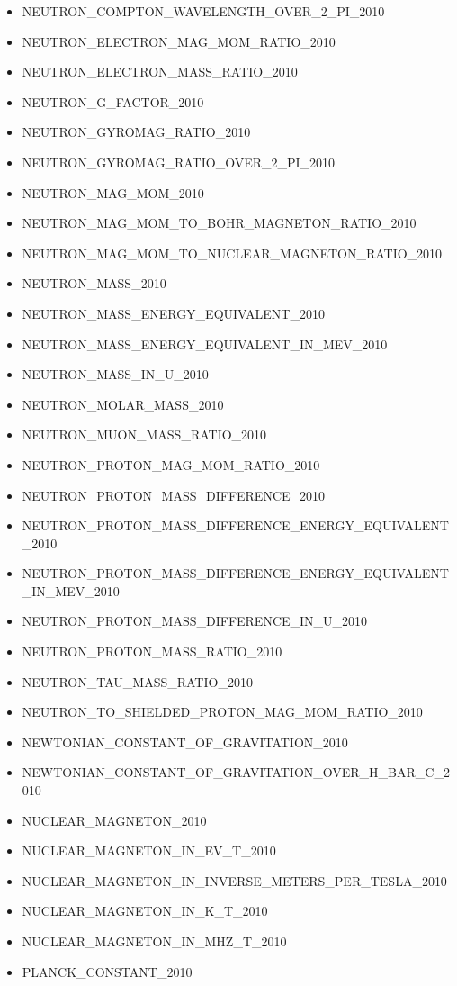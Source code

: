 \begin{itemize}
\item NEUTRON\_COMPTON\_WAVELENGTH\_OVER\_2\_PI\_2010
\item NEUTRON\_ELECTRON\_MAG\_MOM\_RATIO\_2010
\item NEUTRON\_ELECTRON\_MASS\_RATIO\_2010
\item NEUTRON\_G\_FACTOR\_2010
\item NEUTRON\_GYROMAG\_RATIO\_2010
\item NEUTRON\_GYROMAG\_RATIO\_OVER\_2\_PI\_2010
\item NEUTRON\_MAG\_MOM\_2010
\item NEUTRON\_MAG\_MOM\_TO\_BOHR\_MAGNETON\_RATIO\_2010
\item NEUTRON\_MAG\_MOM\_TO\_NUCLEAR\_MAGNETON\_RATIO\_2010
\item NEUTRON\_MASS\_2010
\item NEUTRON\_MASS\_ENERGY\_EQUIVALENT\_2010
\item NEUTRON\_MASS\_ENERGY\_EQUIVALENT\_IN\_MEV\_2010
\item NEUTRON\_MASS\_IN\_U\_2010
\item NEUTRON\_MOLAR\_MASS\_2010
\item NEUTRON\_MUON\_MASS\_RATIO\_2010
\item NEUTRON\_PROTON\_MAG\_MOM\_RATIO\_2010
\item NEUTRON\_PROTON\_MASS\_DIFFERENCE\_2010
\item NEUTRON\_PROTON\_MASS\_DIFFERENCE\_ENERGY\_EQUIVALENT\_2010
\item NEUTRON\_PROTON\_MASS\_DIFFERENCE\_ENERGY\_EQUIVALENT\_IN\_MEV\_2010
\item NEUTRON\_PROTON\_MASS\_DIFFERENCE\_IN\_U\_2010
\item NEUTRON\_PROTON\_MASS\_RATIO\_2010
\item NEUTRON\_TAU\_MASS\_RATIO\_2010
\item NEUTRON\_TO\_SHIELDED\_PROTON\_MAG\_MOM\_RATIO\_2010
\item NEWTONIAN\_CONSTANT\_OF\_GRAVITATION\_2010
\item NEWTONIAN\_CONSTANT\_OF\_GRAVITATION\_OVER\_H\_BAR\_C\_2010
\item NUCLEAR\_MAGNETON\_2010
\item NUCLEAR\_MAGNETON\_IN\_EV\_T\_2010
\item NUCLEAR\_MAGNETON\_IN\_INVERSE\_METERS\_PER\_TESLA\_2010
\item NUCLEAR\_MAGNETON\_IN\_K\_T\_2010
\item NUCLEAR\_MAGNETON\_IN\_MHZ\_T\_2010
\item PLANCK\_CONSTANT\_2010

\end{itemize}
